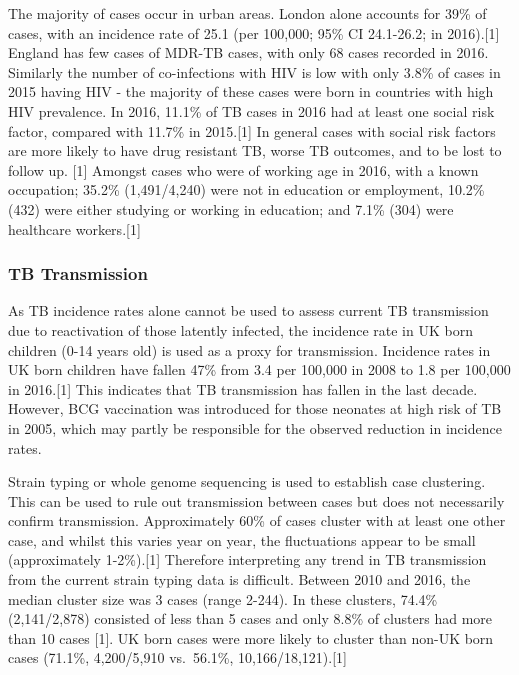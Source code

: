 \documentclass[11pt,twoside]{bristolthesis}
\begin{document}
  The majority of cases occur in urban areas. London alone accounts for 39\% of cases, with an incidence rate of 25.1 (per 100,000; 95\% CI 24.1-26.2; in 2016).{[}1{]} England has few cases of MDR-TB cases, with only 68 cases recorded in 2016. Similarly the number of co-infections with HIV is low with only 3.8\% of cases in 2015 having HIV - the majority of these cases were born in countries with high HIV prevalence. In 2016, 11.1\% of TB cases in 2016 had at least one social risk factor, compared with 11.7\% in 2015.{[}1{]} In general cases with social risk factors are more likely to have drug resistant TB, worse TB outcomes, and to be lost to follow up. {[}1{]} Amongst cases who were of working age in 2016, with a known occupation; 35.2\% (1,491/4,240) were not in education or employment, 10.2\% (432) were either studying or working in education; and 7.1\% (304) were healthcare workers.{[}1{]}
  
  \hypertarget{tb-transmission}{%
  \subsubsection{TB Transmission}\label{tb-transmission}}
  
  As TB incidence rates alone cannot be used to assess current TB transmission due to reactivation of those latently infected, the incidence rate in UK born children (0-14 years old) is used as a proxy for transmission. Incidence rates in UK born children have fallen 47\% from 3.4 per 100,000 in 2008 to 1.8 per 100,000 in 2016.{[}1{]} This indicates that TB transmission has fallen in the last decade. However, BCG vaccination was introduced for those neonates at high risk of TB in 2005, which may partly be responsible for the observed reduction in incidence rates.
  
  Strain typing or whole genome sequencing is used to establish case clustering. This can be used to rule out transmission between cases but does not necessarily confirm transmission. Approximately 60\% of cases cluster with at least one other case, and whilst this varies year on year, the fluctuations appear to be small (approximately 1-2\%).{[}1{]} Therefore interpreting any trend in TB transmission from the current strain typing data is difficult. Between 2010 and 2016, the median cluster size was 3 cases (range 2-244). In these clusters, 74.4\% (2,141/2,878) consisted of less than 5 cases and only 8.8\% of clusters had more than 10 cases {[}1{]}. UK born cases were more likely to cluster than non-UK born cases (71.1\%, 4,200/5,910 vs.~56.1\%, 10,166/18,121).{[}1{]}
  
\end{document}
